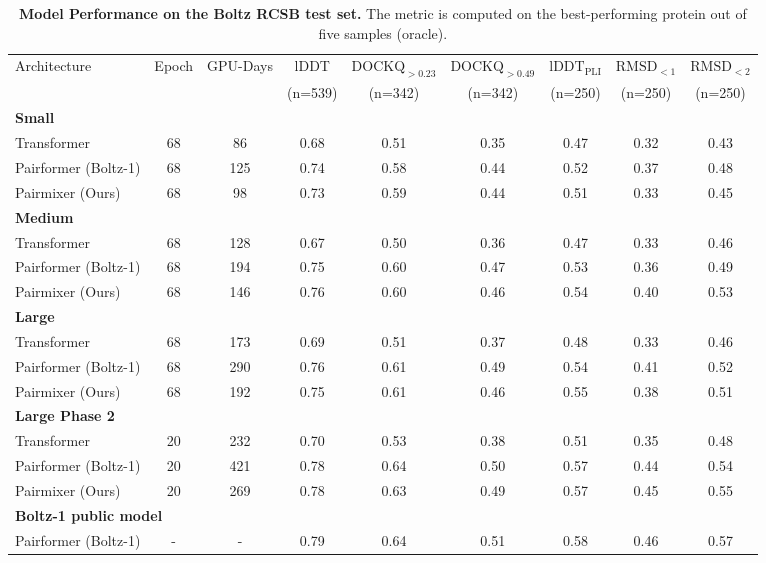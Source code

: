 \documentclass{article} %
\newcommand{\lbltbl}[1]{\label{tbl:#1}}
\begin{document}
\begin{table}[t]
\centering
\caption{
\textbf{Model Performance on the Boltz RCSB test set. }
The metric is computed on the best-performing protein out of five samples (oracle).
}
\tiny
\begin{tabular}{lcccccccc}
\toprule
Architecture & Epoch & GPU-Days & lDDT & $\text{DOCKQ}_{>0.23}$ & $\text{DOCKQ}_{>0.49}$ & $\text{lDDT}_\text{PLI}$ & $\text{RMSD}_{<1}$ & $\text{RMSD}_{<2}$ \\
 & & & (n=539) & (n=342) & (n=342) & (n=250) & (n=250) & (n=250) \\
\midrule
\multicolumn{9}{l}{\textbf{Small }} \\
Transformer & 68 & 86 & 0.68 & 0.51 & 0.35 & 0.47 & 0.32 & 0.43 \\
Pairformer (Boltz-1) & 68 & 125 & 0.74 & 0.58 & 0.44 & 0.52 & 0.37 & 0.48 \\
Pairmixer (Ours) & 68 & 98 & 0.73 & 0.59 & 0.44 & 0.51 & 0.33 & 0.45 \\
\midrule
\multicolumn{9}{l}{\textbf{Medium }} \\
Transformer & 68 & 128 & 0.67 & 0.50 & 0.36 & 0.47 & 0.33 & 0.46 \\
Pairformer (Boltz-1) & 68 & 194 & 0.75 & 0.60 & 0.47 & 0.53 & 0.36 & 0.49 \\
Pairmixer (Ours) & 68 & 146 & 0.76 & 0.60 & 0.46 & 0.54 & 0.40 & 0.53 \\
\midrule
\multicolumn{9}{l}{\textbf{Large }} \\
Transformer & 68 & 173 & 0.69 & 0.51 & 0.37 & 0.48 & 0.33 & 0.46 \\
Pairformer (Boltz-1) & 68 & 290 & 0.76 & 0.61 & 0.49 & 0.54 & 0.41 & 0.52 \\
Pairmixer (Ours) & 68 & 192 & 0.75 & 0.61 & 0.46 & 0.55 & 0.38 & 0.51 \\
\midrule
\multicolumn{9}{l}{\textbf{Large Phase 2}} \\
Transformer & 20 & 232 & 0.70 & 0.53 & 0.38 & 0.51 & 0.35 & 0.48 \\
Pairformer (Boltz-1) & 20 & 421 & 0.78 & 0.64 & 0.50 & 0.57 & 0.44 & 0.54 \\
Pairmixer (Ours) & 20 & 269 & 0.78 & 0.63 & 0.49 & 0.57 & 0.45 & 0.55 \\
\midrule
\multicolumn{9}{l}{\textbf{Boltz-1 public model}} \\
Pairformer (Boltz-1) & - & - & 0.79 & 0.64 & 0.51 & 0.58 & 0.46 & 0.57 \\
\bottomrule
\end{tabular}
\lbltbl{full_results_rcsb}
\end{table}
\end{document}
